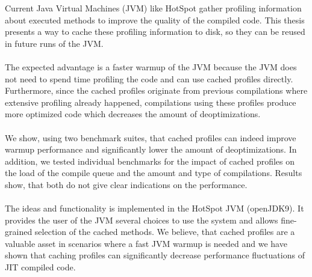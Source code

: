 Current Java Virtual Machines (JVM) like HotSpot gather profiling information about executed methods to improve the quality of the compiled code.
This thesis presents a way to cache these profiling information to disk, so they can be reused in future runs of the JVM.
\\\\
The expected advantage is a faster warmup of the JVM because the JVM does not need to spend time profiling the code and can use cached profiles directly.
Furthermore, since the cached profiles originate from previous compilations where extensive profiling already happened, compilations using these profiles produce more optimized code which decreases the amount of deoptimizations.
\\\\
We show, using two benchmark suites, that cached profiles can indeed improve warmup performance and significantly lower the amount of deoptimizations.
In addition, we tested individual benchmarks for the impact of cached profiles on the load of the compile queue and the amount and type of compilations. Results show, that both do not give clear indications on the performance.
\\\\
The ideas and functionality is implemented in the HotSpot JVM (openJDK9). It provides the user of the JVM several choices to use the system and allows fine-grained selection of the cached methods.
We believe, that cached profiles are a valuable asset in scenarios where a fast JVM warmup is needed and we have shown that caching profiles can significantly decrease performance fluctuations of JIT compiled code.
